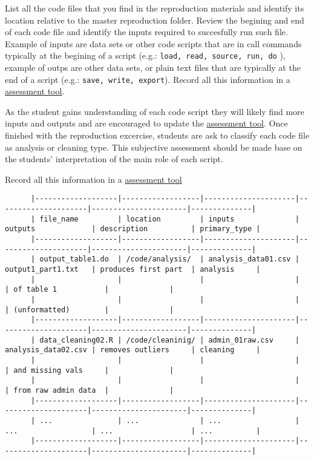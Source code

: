 \documentclass[]{book}
\begin{document}
List all the code files that you find in the reproduction materials and identify its location relative to the master reproduction folder. Review the begining and end of each code file and identify the inputs required to succesfully run such file. Example of inputs are data sets or other code scripts that are in call commands typically at the begining of a script (e.g.: \texttt{load,\ read,\ source,\ run,\ do} ), example of outps are other data sets, or plain text files that are typically at the end of a script (e.g.: \texttt{save,\ write,\ export}). Record all this information in a \href{https://docs.google.com/spreadsheets/d/1LUIdVFH0OfR70C7z07TYeE-uWzKI_JIeWUMaYhqEKK0/edit\#gid=1617799822\&range=A1}{assessment tool}.

As the student gains understanding of each code script they will likely find more inputs and outputs and are encouraged to update the \href{https://docs.google.com/spreadsheets/d/1LUIdVFH0OfR70C7z07TYeE-uWzKI_JIeWUMaYhqEKK0/edit\#gid=1617799822\&range=A1}{assessment tool}. Once finished with the reproduction excercise, students are ask to classify each code file as analysis or cleaning type. This subjective assessment should be made base on the students' interpretation of the main role of each script.

Record all this information in a \href{https://docs.google.com/spreadsheets/d/1LUIdVFH0OfR70C7z07TYeE-uWzKI_JIeWUMaYhqEKK0/edit\#gid=1617799822\&range=A1}{assessment tool}

\begin{verbatim}
      |-------------------|------------------|---------------------|---------------------|----------------------|--------------|
      | file_name         | location         | inputs              | outputs             | description          | primary_type |
      |-------------------|------------------|---------------------|---------------------|----------------------|--------------|
      | output_table1.do  | /code/analysis/  | analysis_data01.csv | output1_part1.txt   | produces first part  | analysis     |
      |                   |                  |                     |                     | of table 1           |              |
      |                   |                  |                     |                     | (unformatted)        |              |
      |-------------------|------------------|---------------------|---------------------|----------------------|--------------|
      | data_cleaning02.R | /code/cleaninig/ | admin_01raw.csv     | analysis_data02.csv | removes outliers     | cleaning     |
      |                   |                  |                     |                     | and missing vals     |              |
      |                   |                  |                     |                     | from raw admin data  |              |
      |-------------------|------------------|---------------------|---------------------|----------------------|--------------|
      | ...               | ...              | ...                 | ...                 | ...                  | ...          |
      |-------------------|------------------|---------------------|---------------------|----------------------|--------------|
\end{verbatim}
\end{document}
